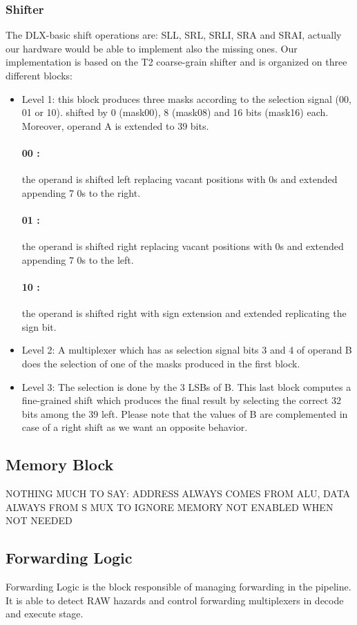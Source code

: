 \documentclass[12pt]{article}
\begin{document}
\subsubsection{Shifter}
The DLX-basic shift operations are: SLL, SRL, SRLI, SRA and SRAI, actually our hardware would be able to implement also the missing ones.
Our implementation is based on the T2 coarse-grain shifter and is organized on three different blocks:
\begin{itemize}
	\item Level 1: this block produces three masks according to the selection signal (00, 01 or 10).
	shifted by 0 (mask00), 8 (mask08) and 16 bits (mask16) each. Moreover, operand A is extended
	to 39 bits.
	\paragraph{00 :} the operand is shifted left replacing vacant positions with 0s and extended appending
	7 0s to the right.
	\paragraph{01 :} the operand is shifted right replacing vacant positions with 0s and extended appending
	7 0s to the left.
	\paragraph{10 :} the operand is shifted right with sign extension and extended replicating the sign bit.
	\item Level 2: A multiplexer which has as selection signal bits 3 and 4 of operand B does the selection of one of the masks produced in the first block.
	\item Level 3: The selection is done by the 3 LSBs of B. This last block computes a fine-grained shift which produces the final result by selecting the correct 32 bits among the 39 left.
	Please note that the values of B are complemented in case of a right shift as we want an opposite behavior.
\end{itemize}


\subsection{Memory Block}
NOTHING MUCH TO SAY: ADDRESS ALWAYS COMES FROM ALU, DATA ALWAYS FROM S
MUX TO IGNORE MEMORY
NOT ENABLED WHEN NOT NEEDED

\subsection{Forwarding Logic}
Forwarding Logic is the block responsible of managing forwarding in the pipeline. It is able to detect RAW hazards and control forwarding multiplexers in decode and execute stage.
\end{document}
